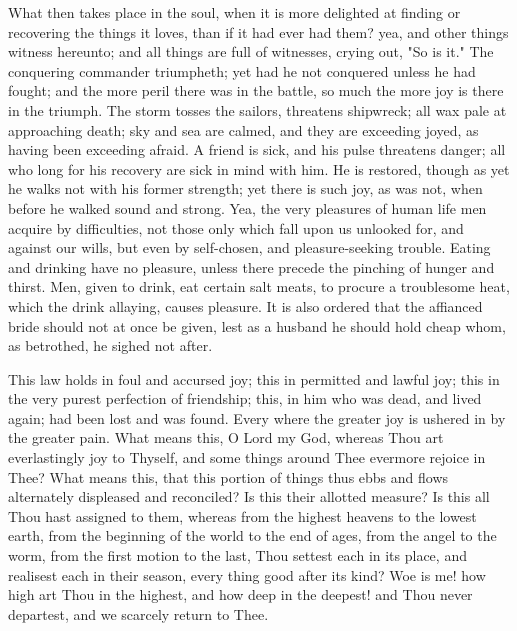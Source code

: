 \documentclass[b5paper,openright,12pt,twoside]{book}
\begin{document}
What then takes place in the soul, when it is more delighted at finding
or recovering the things it loves, than if it had ever had them? yea,
and other things witness hereunto; and all things are full of witnesses,
crying out, "So is it." The conquering commander triumpheth; yet had he
not conquered unless he had fought; and the more peril there was in the
battle, so much the more joy is there in the triumph. The storm tosses
the sailors, threatens shipwreck; all wax pale at approaching death;
sky and sea are calmed, and they are exceeding joyed, as having been
exceeding afraid. A friend is sick, and his pulse threatens danger; all
who long for his recovery are sick in mind with him. He is restored,
though as yet he walks not with his former strength; yet there is such
joy, as was not, when before he walked sound and strong. Yea, the very
pleasures of human life men acquire by difficulties, not those only
which fall upon us unlooked for, and against our wills, but even by
self-chosen, and pleasure-seeking trouble. Eating and drinking have no
pleasure, unless there precede the pinching of hunger and thirst. Men,
given to drink, eat certain salt meats, to procure a troublesome heat,
which the drink allaying, causes pleasure. It is also ordered that the
affianced bride should not at once be given, lest as a husband he should
hold cheap whom, as betrothed, he sighed not after.

This law holds in foul and accursed joy; this in permitted and lawful
joy; this in the very purest perfection of friendship; this, in him who
was dead, and lived again; had been lost and was found. Every where the
greater joy is ushered in by the greater pain. What means this, O Lord
my God, whereas Thou art everlastingly joy to Thyself, and some things
around Thee evermore rejoice in Thee? What means this, that this portion
of things thus ebbs and flows alternately displeased and reconciled?
Is this their allotted measure? Is this all Thou hast assigned to them,
whereas from the highest heavens to the lowest earth, from the beginning
of the world to the end of ages, from the angel to the worm, from the
first motion to the last, Thou settest each in its place, and realisest
each in their season, every thing good after its kind? Woe is me! how
high art Thou in the highest, and how deep in the deepest! and Thou
never departest, and we scarcely return to Thee.
\end{document}
